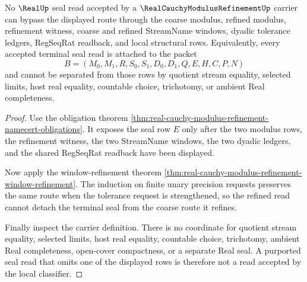 \begin{theorem}
\label{thm:real-cauchy-modulus-refinement-real-seal-nonescape}
No $\RealUp$ seal read accepted by a $\RealCauchyModulusRefinementUp$ carrier can bypass the displayed route through the coarse modulus, refined modulus, refinement witness, coarse and refined StreamName windows, dyadic tolerance ledgers, RegSeqRat readback, and local structural rows. Equivalently, every accepted terminal seal read is attached to the packet
$$
B=(M_0,M_1,R,S_0,S_1,D_0,D_1,Q,E,H,C,P,N)
$$
and cannot be separated from those rows by quotient stream equality, selected limits, host real equality, countable choice, trichotomy, or ambient Real completeness.
\end{theorem}
\begin{proof}
Use the obligation theorem \autoref{thm:real-cauchy-modulus-refinement-namecert-obligations}. It exposes the seal row $E$ only after the two modulus rows, the refinement witness, the two StreamName windows, the two dyadic ledgers, and the shared RegSeqRat readback have been displayed.

Now apply the window-refinement theorem \autoref{thm:real-cauchy-modulus-refinement-window-refinement}. The induction on finite unary precision requests preserves the same route when the tolerance request is strengthened, so the refined read cannot detach the terminal seal from the coarse route it refines.

Finally inspect the carrier definition. There is no coordinate for quotient stream equality, selected limits, host real equality, countable choice, trichotomy, ambient Real completeness, open-cover compactness, or a separate Real seal. A purported seal read that omits one of the displayed rows is therefore not a read accepted by the local classifier.
\end{proof}


